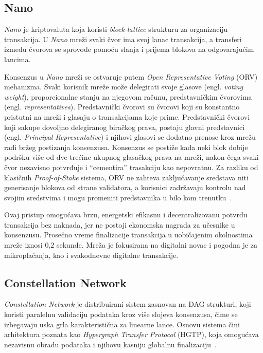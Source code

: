 \subsection{Nano}

\textit{Nano} je kriptovaluta koja koristi \textit{block-lattice} strukturu za organizaciju transakcija. U \textit{Nano} mreži svaki čvor ima svoj lanac transakcija, a transferi između čvorova se sprovode pomoću slanja i prijema blokova na odgovarajućim lancima.

Konsenzus u \textit{Nano} mreži se ostvaruje putem \textit{Open Representative Voting} (ORV) mehanizma. Svaki korisnik mreže može delegirati svoje glasove (engl. \textit{voting weight}), proporcionalne stanju na njegovom računu, predstavničkim čvorovima (engl. \textit{representatives}). Predstavnički čvorovi su čvorovi koji su konstantno pristutni na mreži i glasaju o transakcijama koje prime. Predstavnički čvorovi koji sakupe dovoljno delegiranog biračkog prava, postaju glavni predstavnici (engl. \textit{Principal Representative}) i njihovi glasovi se dodatno prenose kroz mrežu radi bržeg postizanja konsenzusa. Konsenzus se postiže kada neki blok dobije podršku više od dve trećine ukupnog glasačkog prava na mreži, nakon čega svaki čvor nezavisno potvrđuje i \enquote{cementira} trasakciju kao nepovratnu. Za razliku od klasičnih \textit{Proof-of-Stake} sistema, ORV ne zahteva zaključavanje sredstava niti generisanje blokova od strane validatora, a korisnici zadržavaju kontrolu nad svojim sredstvima i mogu promeniti predstavnika u bilo kom trenutku~\cite{ORV consensus}. 

Ovaj pristup omogućava brzu, energetski efikasnu i decentralizovanu potvrdu transakcija bez naknada, jer ne postoji ekonomska nagrada za učesnike u konsenzusu. Prosečno vreme finalizacije transakcija u uobičajenim okolnostima mreže iznosi 0,2 sekunde. Mreža je fokusirana na digitalni novac i pogodna je za mikroplaćanja, kao i svakodnevne digitalne transakcije.~\cite{ORV consensus}

\subsection{Constellation Network}

\textit{Constellation Network} je distribuirani sistem zasnovan na DAG strukturi, koji koristi paralelnu validaciju podataka kroz više slojeva konsenzusa, čime se izbegavaju uska grla karakteristična za linearne lance. Osnovu sistema čini arhitektura poznata kao \textit{Hypergraph Transfer Protocol} (HGTP), koja omogućava nezavisnu obradu podataka i njihovu kasniju globalnu finalizaciju~\cite{constellation docs}.

